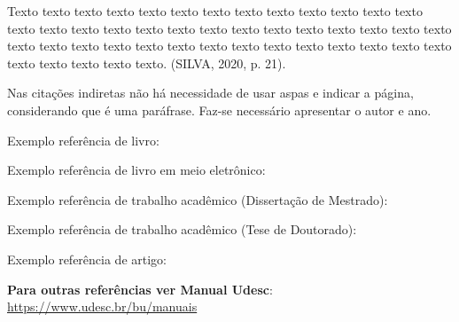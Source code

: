 \begin{citacao}
Texto texto texto texto texto texto texto texto texto texto texto texto texto texto texto texto texto texto texto texto texto texto texto texto texto texto texto texto texto texto texto texto texto texto texto texto texto texto texto texto texto texto texto texto texto texto. (SILVA, 2020, p. 21).
\end{citacao}


Nas citações indiretas não há necessidade de usar aspas e indicar a página, considerando que é uma paráfrase. Faz-se necessário apresentar o autor e ano.






\noindent Exemplo referência de livro: \cite{exemplo_livro}

\noindent Exemplo referência de livro em meio eletrônico: \cite{exemplo_livroe}

\noindent Exemplo referência de trabalho acadêmico (Dissertação de Mestrado): \cite{exemplo_dissertacao}

\noindent Exemplo referência de trabalho acadêmico (Tese de Doutorado): \cite{exemplo_tese}

\noindent Exemplo referência de artigo: \cite{exemplo_artigo}


\textbf{Para outras referências ver Manual Udesc}: \url{https://www.udesc.br/bu/manuais}








